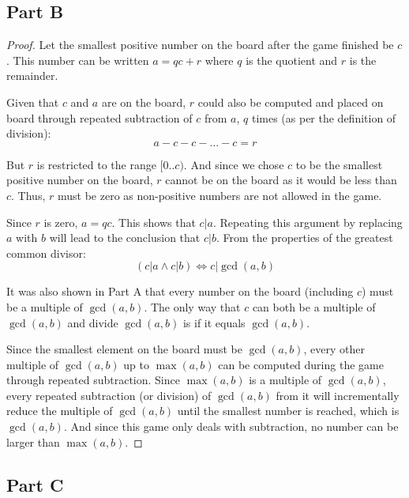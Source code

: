 \documentclass{article}
\begin{document}
\break

\subsection*{Part B}

\begin{proof}

  Let the smallest positive number on the board after the game finished be $c$.
  This number can be written $a = qc + r$ where $q$ is the quotient and $r$ is
  the remainder.

  \bigbreak

  Given that $c$ and $a$ are on the board, $r$ could also be computed and placed
  on board through repeated subtraction of $c$ from $a$, $q$ times (as per the
  definition of division): 
  $$ a - c - c - \ldots - c = r $$

  But $r$ is restricted to the range $[0..c)$. And since we chose $c$ to be the
  smallest positive number on the board, $r$ cannot be on the board as it would
  be less than $c$. Thus, $r$ must be zero as non-positive numbers are not
  allowed in the game.

  \bigbreak

  Since $r$ is zero, $a = qc$. This shows that $c \vert a$. Repeating this
  argument by replacing $a$ with $b$ will lead to the conclusion that $c \vert
  b$.  From the properties of the greatest common divisor: 
  $$ (c \vert a \land c \vert b) \iff c \vert \gcd(a, b) $$

  It was also shown in Part A that every number on the board (including $c$)
  must be a multiple of $\gcd(a, b)$. The only way that $c$ can both be a
  multiple of $\gcd(a,b)$ and divide $\gcd(a,b)$ is if it equals $\gcd(a,b)$.

  \bigbreak

  Since the smallest element on the board must be $\gcd(a, b)$, every other
  multiple of $\gcd(a,b)$ up to $\max(a,b)$ can be computed during the game
  through repeated subtraction. Since $\max(a,b)$ is a multiple of $\gcd(a,b)$,
  every repeated subtraction (or division) of $\gcd(a,b)$ from it will
  incrementally reduce the multiple of $\gcd(a,b)$ until the smallest number is
  reached, which is $\gcd(a,b)$. And since this game only deals with
  subtraction, no number can be larger than $\max(a,b)$.

\end{proof}

\break

\subsection*{Part C}
\end{document}
